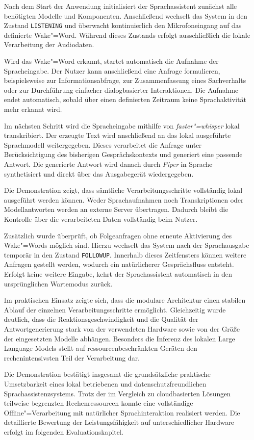Nach dem Start der Anwendung initialisiert der Sprachassistent zunächst alle benötigten Modelle und Komponenten. Anschließend wechselt das System in den Zustand \texttt{LISTENING} und überwacht kontinuierlich den Mikrofoneingang auf das definierte Wake"=Word. Während dieses Zustands erfolgt ausschließlich die lokale Verarbeitung der Audiodaten.

Wird das Wake"=Word erkannt, startet automatisch die Aufnahme der Spracheingabe. Der Nutzer kann anschließend eine Anfrage formulieren, beispielsweise zur Informationsabfrage, zur Zusammenfassung eines Sachverhalts oder zur Durchführung einfacher dialogbasierter Interaktionen. Die Aufnahme endet automatisch, sobald über einen definierten Zeitraum keine Sprachaktivität mehr erkannt wird.

Im nächsten Schritt wird die Spracheingabe mithilfe von \textit{faster"=whisper} lokal transkribiert. Der erzeugte Text wird anschließend an das lokal ausgeführte Sprachmodell weitergegeben. Dieses verarbeitet die Anfrage unter Berücksichtigung des bisherigen Gesprächskontexts und generiert eine passende Antwort. Die generierte Antwort wird danach durch \textit{Piper} in Sprache synthetisiert und direkt über das Ausgabegerät wiedergegeben.

Die Demonstration zeigt, dass sämtliche Verarbeitungsschritte vollständig lokal ausgeführt werden können. Weder Sprachaufnahmen noch Transkriptionen oder Modellantworten werden an externe Server übertragen. Dadurch bleibt die Kontrolle über die verarbeiteten Daten vollständig beim Nutzer.

Zusätzlich wurde überprüft, ob Folgeanfragen ohne erneute Aktivierung des Wake"=Words möglich sind. Hierzu wechselt das System nach der Sprachausgabe temporär in den Zustand \texttt{FOLLOWUP}. Innerhalb dieses Zeitfensters können weitere Anfragen gestellt werden, wodurch ein natürlicherer Gesprächsfluss entsteht. Erfolgt keine weitere Eingabe, kehrt der Sprachassistent automatisch in den ursprünglichen Wartemodus zurück.

Im praktischen Einsatz zeigte sich, dass die modulare Architektur einen stabilen Ablauf der einzelnen Verarbeitungsschritte ermöglicht. Gleichzeitig wurde deutlich, dass die Reaktionsgeschwindigkeit und die Qualität der Antwortgenerierung stark von der verwendeten Hardware sowie von der Größe der eingesetzten Modelle abhängen. Besonders die Inferenz des lokalen Large Language Models stellt auf ressourcenbeschränkten Geräten den rechenintensivsten Teil der Verarbeitung dar.

Die Demonstration bestätigt insgesamt die grundsätzliche praktische Umsetzbarkeit eines lokal betriebenen und datenschutzfreundlichen Sprachassistenzsystems. Trotz der im Vergleich zu cloudbasierten Lösungen teilweise begrenzten Rechenressourcen konnte eine vollständige Offline"=Verarbeitung mit natürlicher Sprachinteraktion realisiert werden. Die detaillierte Bewertung der Leistungsfähigkeit auf unterschiedlicher Hardware erfolgt im folgenden Evaluationskapitel.


